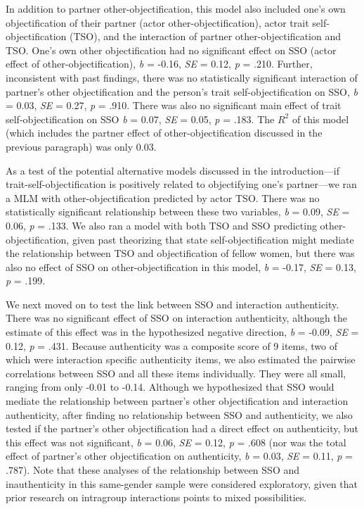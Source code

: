 \documentclass[man]{apa6}
\begin{document}
In addition to partner other-objectification, this model also included
one's own objectification of their partner (actor
other-objectification), actor trait self-objectification (TSO), and the
interaction of partner other-objectification and TSO. One's own other
objectification had no significant effect on SSO (actor effect of
other-objectification), \emph{b} = -0.16, \emph{SE} = 0.12, \emph{p} =
.210. Further, inconsistent with past findings, there was no
statistically significant interaction of partner's other objectification
and the person's trait self-objectification on SSO, \emph{b} = 0.03,
\emph{SE} = 0.27, \emph{p} = .910. There was also no significant main
effect of trait self-objectification on SSO \emph{b} = 0.07, \emph{SE} =
0.05, \emph{p} = .183. The \(R^2\) of this model (which includes the
partner effect of other-objectification discussed in the previous
paragraph) was only 0.03.

As a test of the potential alternative models discussed in the
introduction---if trait-self-objectification is positively related to
objectifying one's partner---we ran a MLM with other-objectification
predicted by actor TSO. There was no statistically significant
relationship between these two variables, \emph{b} = 0.09, \emph{SE} =
0.06, \emph{p} = .133. We also ran a model with both TSO and SSO
predicting other-objectification, given past theorizing that state
self-objectification might mediate the relationship between TSO and
objectification of fellow women, but there was also no effect of SSO on
other-objectification in this model, \emph{b} = -0.17, \emph{SE} = 0.13,
\emph{p} = .199.

We next moved on to test the link between SSO and interaction
authenticity. There was no significant effect of SSO on interaction
authenticity, although the estimate of this effect was in the
hypothesized negative direction, \emph{b} = -0.09, \emph{SE} = 0.12,
\emph{p} = .431. Because authenticity was a composite score of 9 items,
two of which were interaction specific authenticity items, we also
estimated the pairwise correlations between SSO and all these items
individually. They were all small, ranging from only -0.01 to -0.14.
Although we hypothesized that SSO would mediate the relationship between
partner's other objectification and interaction authenticity, after
finding no relationship between SSO and authenticity, we also tested if
the partner's other objectification had a direct effect on authenticity,
but this effect was not significant, \emph{b} = 0.06, \emph{SE} = 0.12,
\emph{p} = .608 (nor was the total effect of partner's other
objectification on authenticity, \emph{b} = 0.03, \emph{SE} = 0.11,
\emph{p} = .787). Note that these analyses of the relationship between
SSO and inauthenticity in this same-gender sample were considered
exploratory, given that prior research on intragroup interactions points
to mixed possibilities.
\end{document}
